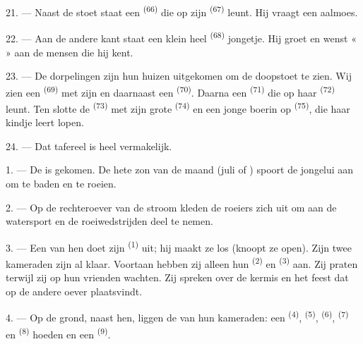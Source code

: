 \VUsaut{4.6mm}
\VUsaut{3.4mm}

21. --- Naast de stoet staat een  \textsuperscript{(66)} die op zijn
 \textsuperscript{(67)} leunt. Hij vraagt een aalmoes.

22. --- Aan de andere kant staat een klein heel  \textsuperscript{(68)}
jongetje. Hij groet en wenst «  » aan de mensen die hij kent.

23. --- De dorpelingen zijn hun huizen uitgekomen om de doopstoet te zien. Wij zien een
 \textsuperscript{(69)} met zijn  en daarnaast een
 \textsuperscript{(70)}. Daarna een  \textsuperscript{(71)}
die op haar  \textsuperscript{(72)} leunt. Ten slotte de 
\textsuperscript{(73)} met zijn grote
 \textsuperscript{(74)} en een jonge boerin op
 \textsuperscript{(75)}, die haar kindje leert lopen.

24. --- Dat tafereel is heel vermakelijk.
\VUsaut{4.0mm}

\VUsaut{3.0mm}

\VUsaut{2.4mm}

\VUsaut{3.0mm}

1. --- De  is gekomen. De hete zon van de maand  (juli of
) spoort de jongelui aan om te baden en te roeien.

2. --- Op de rechteroever van de stroom kleden de roeiers zich uit om aan de watersport en de
roeiwedstrijden deel te nemen.

3. --- Een van hen doet zijn  \textsuperscript{(1)} uit; hij maakt ze los
(knoopt ze open). Zijn twee kameraden zijn al klaar. Voortaan hebben zij alleen hun
 \textsuperscript{(2)} en
 \textsuperscript{(3)} aan. Zij praten terwijl zij op hun
vrienden wachten. Zij spreken over de kermis en het feest dat op de andere oever plaatsvindt.

4. --- Op de grond, naast hen, liggen de  van hun kameraden: een
  \textsuperscript{(4)}, 
\textsuperscript{(5)},  \textsuperscript{(6)}, 
\textsuperscript{(7)} en  \textsuperscript{(8)} hoeden en een
 \textsuperscript{(9)}.

